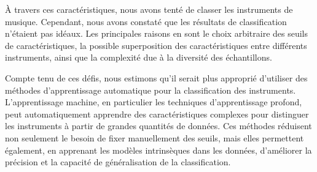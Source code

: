 À travers ces caractéristiques, nous avons tenté de classer les instruments de musique. Cependant, nous avons constaté que les résultats de classification n'étaient pas idéaux. Les principales raisons en sont le choix arbitraire des seuils de caractéristiques, la possible superposition des caractéristiques entre différents instruments, ainsi que la complexité due à la diversité des échantillons.

Compte tenu de ces défis, nous estimons qu'il serait plus approprié d'utiliser des méthodes d'apprentissage automatique pour la classification des instruments. L'apprentissage machine, en particulier les techniques d'apprentissage profond, peut automatiquement apprendre des caractéristiques complexes pour distinguer les instruments à partir de grandes quantités de données. Ces méthodes réduisent non seulement le besoin de fixer manuellement des seuils, mais elles permettent également, en apprenant les modèles intrinsèques dans les données, d'améliorer la précision et la capacité de généralisation de la classification.